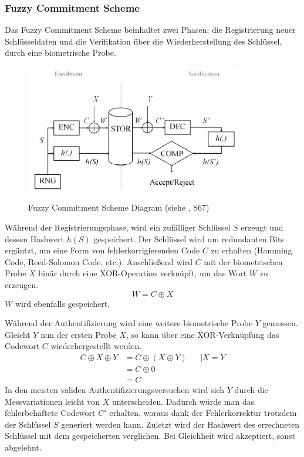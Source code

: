 \documentclass{article}
\begin{document}
    \subsubsection{Fuzzy Commitment Scheme}
    Das Fuzzy Commitment Scheme beinhaltet zwei Phasen: die Registrierung neuer Schlüsseldaten und die Verifikation über
    die Wiederherstellung des Schlüssel, durch eine biometrische Probe.
    \begin{figure}[h]
        \caption{Fuzzy Commitment Scheme Diagram (siehe \cite{Uhl2016}, S67)}
        \centering
        \includegraphics[width=0.85\textwidth]{img/fcs.png}
        \label{fig:fcs}
    \end{figure}
    Während der Registrierungsphase, wird ein zufälliger Schlüssel $S$ erzeugt und dessen Hashwert $h(S)$ gespeichert.
    Der Schlüssel wird um redundanten Bits ergäntzt, um eine Form von fehlerkorrigierenden Code $C$ zu erhalten (Hamming Code, 
    Reed-Solomon Code, etc.). Anschließend wird $C$ mit der biometrischen Probe $X$ binär durch eine XOR-Operation 
    verknüpft, um das Wort $W$ zu erzeugen.
    \[
        W = C \oplus X
    \]
    $W$ wird ebenfalls gespeichert.

    Während der Authentifizierung wird eine weitere biometrische Probe $Y$ gemessen. Gleicht $Y$ nun der ersten Probe $X$,
    so kann über eine XOR-Verknüpfung das Codewort $C$ wiederhergestellt werden.
    \begin{align*}
        C\oplus X \oplus Y &= C \oplus (X\oplus Y) &&\mid X = Y\\
        &= C\oplus 0\\
        &= C 
    \end{align*}
    In den meisten validen Authentifizierungsversuchen wird sich $Y$ durch die Messvariationen leicht von $X$ unterscheiden. 
    Dadurch würde man das fehlerbehaftete Codewort $C'$ erhalten, woraus dank der Fehlerkorrektur trotzdem der Schlüssel
    $S$ generiert werden kann. Zuletzt wird der Hashwert des errechneten Schlüssel mit dem gespeicherten verglichen.
    Bei Gleichheit wird akzeptiert, sonst abgelehnt.
\end{document}
